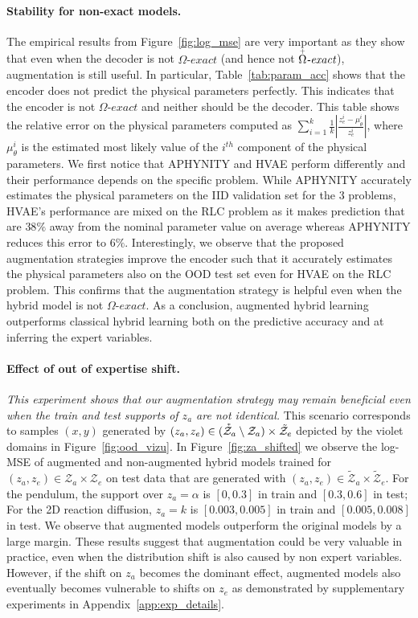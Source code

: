\documentclass{article}
\newcommand\figref{Figure~\ref}
\newcommand\tabref{Table~\ref}
\newcommand\appref{Appendix~\ref}
\begin{document}
\paragraph{Stability for non-exact models.}
The empirical results from \figref{fig:log_mse} are very important as they show that even when the decoder is not $\Omega\textit{-exact}$ (and hence not $\accentset{+}{\Omega}\textit{-exact}$), augmentation is still useful. In particular, \tabref{tab:param_acc} shows that the encoder does not predict the physical parameters perfectly. This indicates that the encoder is not $\Omega\textit{-exact}$ and neither should be the decoder. This table shows the relative error on the physical parameters computed as $\sum_{i=1}^k\frac{1}{k}\left|\frac{z_e^i - \mu_\theta^i}{z_e^i}\right|$, where $\mu_\theta^i$ is the estimated most likely value of the $i^{th}$ component of the physical parameters. We first notice that APHYNITY and HVAE perform differently and their performance depends on the specific problem. While APHYNITY accurately estimates the physical parameters on the IID validation set for the 3 problems, HVAE's performance are mixed on the RLC problem as it makes prediction that are $38\%$ away from the nominal parameter value on average whereas APHYNITY reduces this error to $6\%$. Interestingly, we observe that the proposed augmentation strategies improve the encoder such that it accurately estimates the physical parameters also on the OOD test set even for HVAE on the RLC problem. This confirms that the augmentation strategy is helpful even when the hybrid model is not $\Omega\textit{-exact}$. As a conclusion, augmented hybrid learning outperforms classical hybrid learning both on the predictive accuracy and at inferring the expert variables.

\paragraph{Effect of out of expertise shift.}
\textit{This experiment shows that our augmentation strategy may remain beneficial even when the train and test supports of $z_a$ are not identical.} This scenario corresponds to samples $(x, y)$ generated by $(z_a, z_e) \in (\accentset{\ast}{\mathcal{Z}}_a \setminus \mathcal{Z}_a) \times \tilde{\mathcal{Z}}_e$ depicted by the violet domains in \figref{fig:ood_vizu}. In \figref{fig:za_shifted} we observe the log-MSE of augmented and non-augmented hybrid models trained for $(z_a, z_e) \in \mathcal{Z}_a \times \mathcal{Z}_e$ on test data that are generated with $(z_a, z_e) \in \tilde{\mathcal{Z}}_a \times \tilde{\mathcal{Z}}_e$. For the pendulum, the support over $z_a=\alpha$ is $\left[0, 0.3\right]$ in train and $\left[0.3, 0.6\right]$ in test; For the 2D reaction diffusion, $z_a=k$ is $\left[0.003, 0.005\right]$ in train and $\left[0.005, 0.008\right]$ in test. We observe that augmented models outperform the original models by a large margin. These results suggest that augmentation could be very valuable in practice, even when the distribution shift is also caused by non expert variables. However, if the shift on $z_a$ becomes the dominant effect, augmented models also eventually becomes vulnerable to shifts on $z_e$ as demonstrated by supplementary experiments in \appref{app:exp_details}.  
\end{document}
